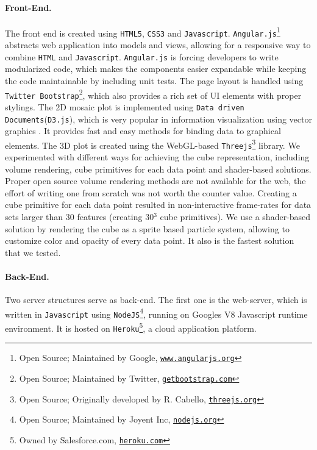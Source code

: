 \documentclass[journal]{style/vgtc} 			          %
\begin{document}
\paragraph{Front-End.}
The front end is created using \texttt{HTML5}, \texttt{CSS3} and \texttt{Javascript}.
\texttt{Angular.js}\footnote{Open Source; Maintained by Google, \href{https://www.angularjs.org/}{\texttt{www.angularjs.org}}} abstracts web application into models and views, allowing for a responsive way to combine \texttt{HTML} and \texttt{Javascript}.
\texttt{Angular.js} is forcing developers to write modularized code, which makes the components easier expandable while keeping the code maintainable by including unit tests.
The page layout is handled using \texttt{Twitter Bootstrap}\footnote{Open Source; Maintained by Twitter, \href{http://getbootstrap.com}{\texttt{getbootstrap.com}}}, which also provides a rich set of UI elements with proper stylings.
The 2D mosaic plot is implemented using \texttt{Data driven Documents}(\texttt{D3.js}), which is very popular in information visualization using vector graphics \cite{D3}.
It provides fast and easy methods for binding data to graphical elements.
The 3D plot is created using the WebGL-based \texttt{Threejs}\footnote{Open Source; Originally developed by R. Cabello, \href{http://threejs.org}{\texttt{threejs.org}}} library.
We experimented with different ways for achieving the cube representation, including volume rendering, cube primitives for each data point and shader-based solutions.
Proper open source volume rendering methods are not available for the web, the effort of writing one from scratch was not worth the counter value.
Creating a cube primitive for each data point resulted in non-interactive frame-rates for data sets larger than 30 features (creating 30$^3$ cube primitives).
We use a shader-based solution by rendering the cube as a sprite based particle system, allowing to customize color and opacity of every data point.
It also is the fastest solution that we tested.

\paragraph{Back-End.}
Two server structures serve as back-end.
The first one is the web-server, which is written in \texttt{Javascript} using \texttt{NodeJS}\footnote{Open Source; Maintained by Joyent Inc, \href{http://nodejs.org}{\texttt{nodejs.org}}}, running on Googles V8 Javascript runtime environment.
It is hosted on \texttt{Heroku}\footnote{Owned by Salesforce.com, \href{https://www.heroku.com/}{\texttt{heroku.com}}}, a cloud application platform.
\end{document}
